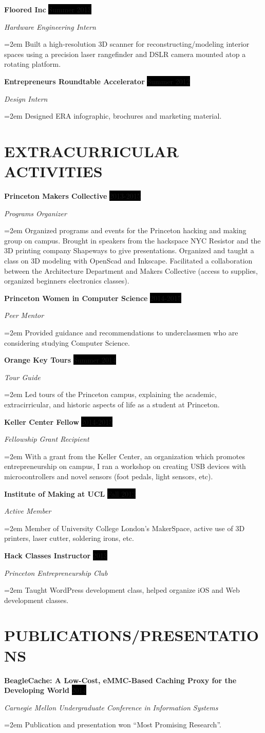 \documentclass[paper=a4,fontsize=11pt]{scrartcl} %
\newcommand{\sepspace}{\vspace*{1em}}		%
\newcommand{\NewPart}[1]{\section*{\uppercase{#1}}}
\newcommand{\EducationEntry}[4]{
		\noindent \textbf{#1} \hfill      %
		\colorbox{Black}{%
			\parbox{6em}{%
			\hfill\color{White}#2}} \par  %
		\noindent \textit{#3} \par        %
		\noindent\hangindent=2em\hangafter=0 \small #4 %
		\normalsize \par}
\newcommand{\WorkEntry}[4]{				  %
		\noindent \textbf{#1} \hfill      %
		\colorbox{Black}{\color{White}#2} \par  %
		\noindent \textit{#3} \par              %
		\noindent\hangindent=2em\hangafter=0 \small #4 %
		\normalsize \par}
\begin{document}
\WorkEntry{Floored Inc}{Summer 2013}{Hardware Engineering Intern}{
	Built a high-resolution 3D scanner for reconstructing/modeling interior spaces using a precision laser rangefinder and DSLR camera mounted atop a rotating platform.
}
\sepspace

\WorkEntry{Entrepreneurs Roundtable Accelerator}{Summer 2012}{Design Intern}{Designed ERA infographic, brochures and marketing material.  }


\NewPart{Extracurricular Activities}{}

\WorkEntry{Princeton Makers Collective}{2013-2015}{Programs Organizer}{
	Organized programs and events for the Princeton hacking and making group on campus.  Brought in speakers from the hackspace NYC Resistor and the 3D printing company Shapeways to give presentations.  Organized and taught a class on 3D modeling with OpenScad and Inkscape.  Facilitated a collaboration between the Architecture Department and Makers Collective (access to supplies, organized beginners electronics classes).
}
\sepspace

\WorkEntry{Princeton Women in Computer Science}{2014-2015}{Peer Mentor}{
	Provided guidance and recommendations to underclassmen who are considering studying Computer Science.
}
\sepspace

\WorkEntry{Orange Key Tours}{Summer 2014}{Tour Guide}{
	Led tours of the Princeton campus, explaining the academic, extracirricular, and historic aspects of life as a student at Princeton.
}
\sepspace

\WorkEntry{Keller Center Fellow}{2014-2015}{Fellowship Grant Recipient}{
	With a grant from the Keller Center, an organization which promotes entrepreneurship on campus, I ran a workshop on creating USB devices with microcontrollers and novel sensors (foot pedals, light sensors, etc).
}
\sepspace

\WorkEntry{Institute of Making at UCL}{Fall 2013}{Active Member}{
	Member of University College London's MakerSpace, active use of 3D printers, laser cutter, soldering irons, etc.
}
\sepspace

\WorkEntry{Hack Classes Instructor}{2013}{Princeton Entrepreneurship Club}{
	Taught WordPress development class, helped organize iOS and Web development classes.
}
\sepspace

\NewPart{Publications/Presentations}{}

\WorkEntry{BeagleCache: A Low-Cost, eMMC-Based Caching Proxy for the Developing World}{2014}{Carnegie Mellon Undergraduate Conference in Information Systems}{
	Publication and presentation won ``Most Promising Research''.
}
\sepspace
\end{document}
